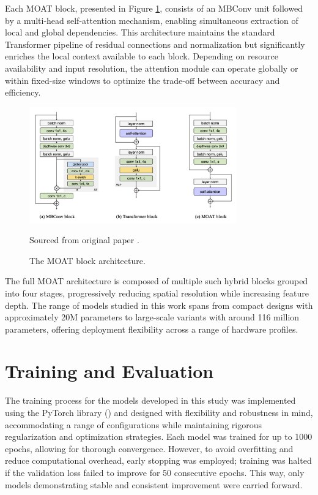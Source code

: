 \documentclass[a4paper,11pt,twoside]{report}
\theoremstyle{definition}
\begin{document}
Each MOAT block, presented in Figure \ref{fig:MOAT}, consists of an MBConv unit followed by a multi-head self-attention mechanism, enabling simultaneous extraction of local and global dependencies. This architecture maintains the standard Transformer pipeline of residual connections and normalization but significantly enriches the local context available to each block. Depending on resource availability and input resolution, the attention module can operate globally or within fixed-size windows to optimize the trade-off between accuracy and efficiency.

\begin{figure}[h!]
  \centering
  \includegraphics[width=0.8\textwidth]{img_methodology/MOAT.png}
  \caption{The MOAT block architecture.}
  \footnotesize{Sourced from original paper \cite{MOAT}.}
  \label{fig:MOAT}
\end{figure}

The full MOAT architecture is composed of multiple such hybrid blocks grouped into four stages, progressively reducing spatial resolution while increasing feature depth. The range of models studied in this work spans from compact designs with approximately 20M parameters to large-scale variants with around 116 million parameters, offering deployment flexibility across a range of hardware profiles.


\section{Training and Evaluation}

The training process for the models developed in this study was implemented using the PyTorch library (\cite{pytorch}) and designed with flexibility and robustness in mind, accommodating a range of configurations while maintaining rigorous regularization and optimization strategies. Each model was trained for up to 1000 epochs, allowing for thorough convergence. However, to avoid overfitting and reduce computational overhead, early stopping was employed; training was halted if the validation loss failed to improve for 50 consecutive epochs. This way, only models demonstrating stable and consistent improvement were carried forward.
\end{document}

